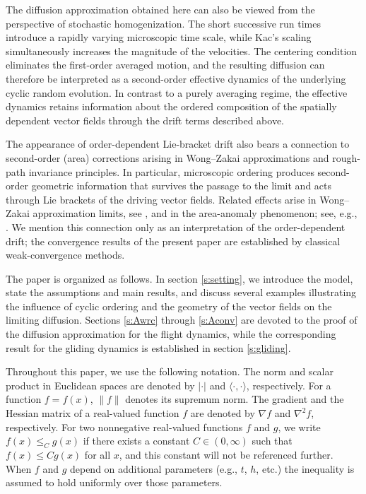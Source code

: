 \documentclass[10pt]{article}
\newcommand{\1}{1\!\!\!\;{\rm I}}
\theoremstyle{plain}
\theoremstyle{definition}
\numberwithin{equation}{section}
\begin{document}
The diffusion approximation obtained here can also be viewed from the perspective of stochastic homogenization.
The short successive run times introduce a rapidly varying microscopic time scale,
while Kac's scaling simultaneously increases the magnitude of the velocities.
The centering condition eliminates the first-order averaged motion, and the resulting diffusion
can therefore be interpreted as a second-order effective dynamics of the underlying cyclic
random evolution. In contrast to a purely averaging regime, the effective dynamics retains
information about the ordered composition of the spatially dependent vector fields through the drift terms described above.

The appearance of order-dependent Lie-bracket drift also bears a connection to second-order (area)
corrections arising in Wong--Zakai approximations and rough-path invariance principles.
In particular, microscopic ordering produces second-order geometric information that survives the passage to the limit
and acts through Lie brackets of the driving vector fields. Related effects arise in
Wong--Zakai approximation limits, see \cite[Theorem 7.2 in Chapter 7]{IW89},
and in the area-anomaly phenomenon; see, e.g., \cite{lopusanschi2020area,diamantakis2025levy}.
We mention this connection only as an interpretation of the order-dependent drift; the convergence
results of the present paper are established by classical weak-convergence methods.

The paper is organized as follows.
In section \ref{s:setting}, we introduce the model, state the assumptions and main results, and
discuss several examples illustrating the influence of cyclic ordering and the geometry
of the vector fields on the limiting diffusion. Sections \ref{s:Awrc}
through \ref{s:Aconv} are devoted to the proof of the diffusion approximation for the flight dynamics,
while the corresponding result for the gliding dynamics is established in section \ref{s:gliding}.



Throughout this paper, we use the following notation.
The norm and scalar product in Euclidean spaces are denoted by $|\cdot|$ and
$\langle\cdot,\cdot\rangle$, respectively.
For a function $f=f(x)$, $\|f\|$ denotes
its supremum norm. The gradient and the Hessian matrix of a real-valued function $f$ are denoted by $\nabla f$ and $\nabla^2f$,
respectively.
For two nonnegative real-valued functions $f$ and $g$, we write $f(x)\leq_C g(x)$ if there exists a constant $C\in (0,\infty)$ such that
$f(x)\leq C g(x)$ for all $x$, and this constant will not be referenced further.
When $f$ and $g$ depend on additional parameters (e.g., $t$, $h$, etc.)
the inequality is assumed to hold uniformly over those parameters.
\end{document}
